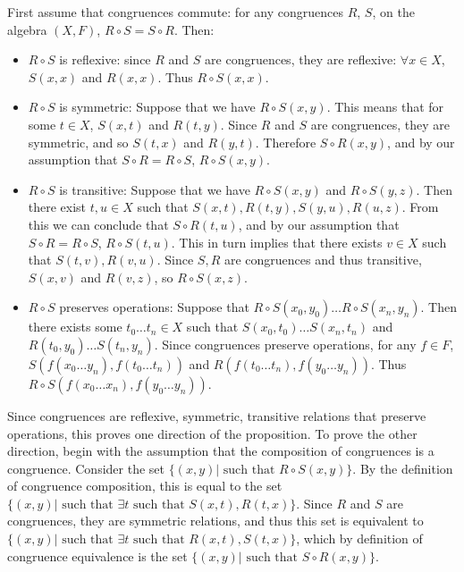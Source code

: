 \documentclass{article}
\begin{document}
First assume that congruences commute: for any congruences $R$, $S$, on  the algebra $(X, F)$, $R \circ S = S \circ R$. Then:

\begin{itemize}
\item{$R \circ S$ is reflexive: since $R$ and $S$ are congruences, they are reflexive: $\forall x \in X$, $S(x, x)$ and $R(x, x)$. Thus $R \circ S (x, x)$.}
\item{$R \circ S$ is symmetric: Suppose that we have $R \circ S (x, y)$. This means that for some $t \in X$, $S(x, t)$ and $R(t, y)$. Since $R$ and $S$ are congruences, they are symmetric, and so $S(t, x)$ and $R(y, t)$. Therefore  $S \circ R (x, y)$, and by our assumption that $S \circ R = R \circ S$, $R \circ S (x, y)$.}
\item{$R \circ S$ is transitive: Suppose that we have $R \circ S (x, y)$ and $R \circ S (y, z)$. Then there exist $t, u \in X$ such that $S(x, t), R(t, y), S(y, u), R(u, z)$. From this we can conclude that $S \circ R (t, u)$, and by our assumption that $S \circ R = R \circ S$, $R \circ S(t, u)$. This in turn implies that there exists $v \in X$ such that $S(t, v), R(v, u)$. Since $S, R$ are congruences and thus transitive, $S(x, v)$ and $R(v, z)$, so $R \circ S(x, z)$.}
\item{$R \circ S$ preserves operations: Suppose that $R \circ S(x_0, y_0) \dots R \circ S(x_n, y_n)$. Then there exists some $t_0 \dots t_n \in X$ such that $S(x_0, t_0) \dots S(x_n, t_n)$ and $R(t_0, y_0) \dots  S(t_n, y_n)$. Since congruences preserve operations, for any $f \in F$, $S(f(x_0 \dots y_n), f(t_0 \dots t_n))$ and $R(f(t_0 \dots t_n), f(y_0 \dots y_n))$. Thus $R \circ S(f(x_0 \dots x_n), f(y_0 \dots y_n))$.}
\end{itemize}

Since congruences are reflexive, symmetric, transitive relations that preserve operations, this proves one direction of the proposition. To prove the other direction, begin with the assumption that the composition of congruences is a congruence. Consider the set $\{(x, y) | \text{ such that } R \circ S(x, y)\}$. By the definition of congruence composition, this is equal to the set $\{(x, y) | \text{ such that } \exists t \text{ such that } S(x, t), R(t, x)\}$. Since $R$ and $S$ are congruences, they are symmetric relations, and thus this set is equivalent to $\{(x, y) | \text{ such that } \exists t \text{ such that } R(x, t), S(t, x)\}$, which by definition of congruence equivalence is the set $\{(x, y) | \text{ such that } S \circ R(x, y)\}$.
\end{document}
